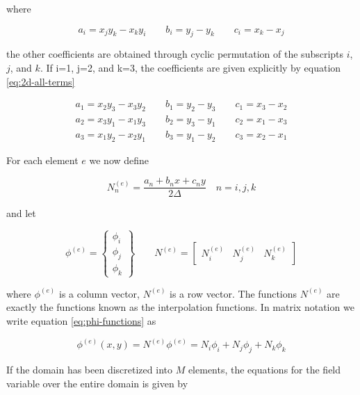 where

\begin{equation}
a_i = x_j y_k - x_k y_i \qquad
b_i = y_j - y_k \qquad
c_i = x_k - x_j
\end{equation}

the other coefficients are obtained through cyclic permutation of
the subscripts $i$, $j$, and $k$. If i=1, j=2, and k=3, the
coefficients are given explicitly by equation \eqref{eq:2d-all-terms}

\begin{equation}
\label{eq:2d-all-terms}
\begin{aligned}
a_1 = x_2 y_3 - x_3 y_2 \qquad b_1 = y_2 - y_3 \qquad c_1 = x_3 - x_2 \\
a_2 = x_3 y_1 - x_1 y_3 \qquad b_2 = y_3 - y_1 \qquad c_2 = x_1 - x_3 \\
a_3 = x_1 y_2 - x_2 y_1 \qquad b_3 = y_1 - y_2 \qquad c_3 = x_2 - x_1
\end{aligned}
\end{equation}

For each element $e$ we now define

\begin{equation}
N_n^{(e)} = \frac{a_n + b_n x + c_n y}{2 \Delta} \quad n=i,j,k
\end{equation}

and let

\begin{equation}
\phi^{(e)} =
\begin{Bmatrix}
\phi_i \\ \phi_j \\ \phi_k
\end{Bmatrix}
\qquad
N^{(e)} = 
\begin{bmatrix}
  N_i^{(e)} & N_j^{(e)} & N_k^{(e)}
\end{bmatrix}
\end{equation}

where $\phi^{(e)}$ is a column vector, $N^{(e)}$ is a row vector.
The functions $N^{(e)}$ are exactly the functions known as the
interpolation functions. In matrix notation we write equation
\eqref{eq:phi-functions} as

\begin{equation}
\label{eq:phi-and-N-functions}
\phi^{(e)}(x,y) = N^{(e)} \phi^{(e)} =
N_i \phi_i + N_j \phi_j + N_k \phi_k
\end{equation}


If the domain has been discretized into $M$ elements, the equations
for the field variable over the entire domain is given by

